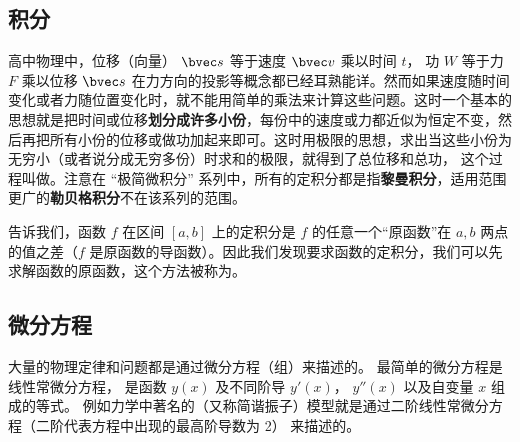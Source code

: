 
\subsection{积分}
高中物理中，位移（向量） $\bvec s$ 等于速度 $\bvec v$ 乘以时间 $t$， 功 $W$ 等于力 $F$ 乘以位移 $\bvec s$ 在力方向的投影等概念都已经耳熟能详。然而如果速度随时间变化或者力随位置变化时，就不能用简单的乘法来计算这些问题。这时一个基本的思想就是把时间或位移\textbf{划分成许多小份}，每份中的速度或力都近似为恒定不变，然后再把所有小份的位移或做功加起来即可。这时用极限的思想，求出当这些小份为无穷小（或者说分成无穷多份）时求和的极限，就得到了总位移和总功， 这个过程叫做。注意在 “极简微积分” 系列中，所有的定积分都是指\textbf{黎曼积分}，适用范围更广的\textbf{勒贝格积分}不在该系列的范围。 %

告诉我们，函数 $f$ 在区间 $[a, b]$ 上的定积分是 $f$ 的任意一个“原函数”在 $a, b$ 两点的值之差（$f$ 是原函数的导函数）。因此我们发现要求函数的定积分，我们可以先求解函数的原函数，这个方法被称为。

\subsection{微分方程}
大量的物理定律和问题都是通过微分方程（组）来描述的。 最简单的微分方程是线性常微分方程，%
是函数 $y(x)$ 及不同阶导 $y'(x)$， $y''(x)$ 以及自变量 $x$ 组成的等式。 例如力学中著名的（又称简谐振子）模型就是通过二阶线性常微分方程（二阶代表方程中出现的最高阶导数为 2） 来描述的。



